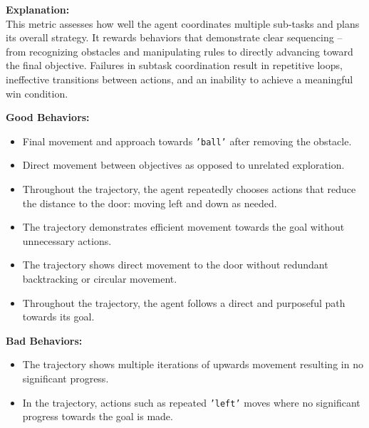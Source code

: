 \fontsize{9.5pt}{11pt}\selectfont
\begin{tcolorbox}
	[ colback=gray!5!white, colframe=gray!60, title=\textbf{\textcolor{black}{Iteration
	2: Subtask Coordination and Overall Task Planning}}]

	\textbf{Explanation:} \\ This metric assesses how well the agent coordinates multiple
	sub-tasks and plans its overall strategy. It rewards behaviors that
	demonstrate clear sequencing – from recognizing obstacles and manipulating
	rules to directly advancing toward the final objective. Failures in subtask coordination
	result in repetitive loops, ineffective transitions between actions, and an inability
	to achieve a meaningful win condition.

	\vspace{1em}
	\textbf{Good Behaviors:}
	\begin{itemize}
		\item Final movement and approach towards \texttt{'ball'} after removing the
			obstacle.

		\item Direct movement between objectives as opposed to unrelated exploration.

		\item Throughout the trajectory, the agent repeatedly chooses actions that
			reduce the distance to the door: moving left and down as needed.

		\item The trajectory demonstrates efficient movement towards the goal without
			unnecessary actions.

		\item The trajectory shows direct movement to the door without redundant backtracking
			or circular movement.

		\item Throughout the trajectory, the agent follows a direct and purposeful
			path towards its goal.
	\end{itemize}

	\vspace{0.5em}
	\textbf{Bad Behaviors:}
	\begin{itemize}
		\item The trajectory shows multiple iterations of upwards movement resulting
			in no significant progress.

		\item In the trajectory, actions such as repeated \texttt{'left'} moves where
			no significant progress towards the goal is made.


\end{itemize}
\end{tcolorbox}
